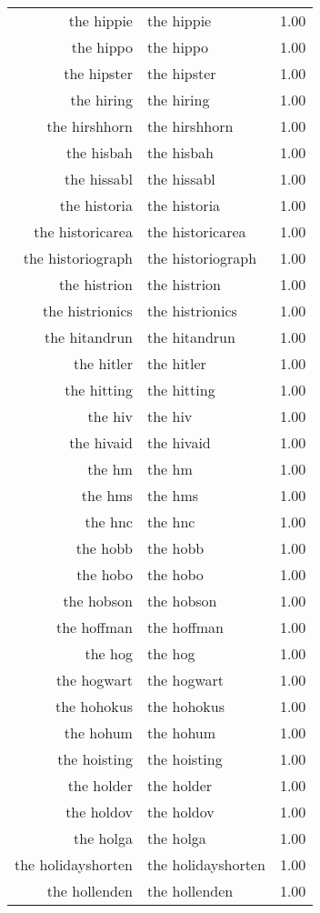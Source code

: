 \begin{table}[ht]
\begin{tabular}{rlr}
  the hippie & the hippie & 1.00 \\ 
  the hippo & the hippo & 1.00 \\ 
  the hipster & the hipster & 1.00 \\ 
  the hiring & the hiring & 1.00 \\ 
  the hirshhorn & the hirshhorn & 1.00 \\ 
  the hisbah & the hisbah & 1.00 \\ 
  the hissabl & the hissabl & 1.00 \\ 
  the historia & the historia & 1.00 \\ 
  the historicarea & the historicarea & 1.00 \\ 
  the historiograph & the historiograph & 1.00 \\ 
  the histrion & the histrion & 1.00 \\ 
  the histrionics & the histrionics & 1.00 \\ 
  the hitandrun & the hitandrun & 1.00 \\ 
  the hitler & the hitler & 1.00 \\ 
  the hitting & the hitting & 1.00 \\ 
  the hiv & the hiv & 1.00 \\ 
  the hivaid & the hivaid & 1.00 \\ 
  the hm & the hm & 1.00 \\ 
  the hms & the hms & 1.00 \\ 
  the hnc & the hnc & 1.00 \\ 
  the hobb & the hobb & 1.00 \\ 
  the hobo & the hobo & 1.00 \\ 
  the hobson & the hobson & 1.00 \\ 
  the hoffman & the hoffman & 1.00 \\ 
  the hog & the hog & 1.00 \\ 
  the hogwart & the hogwart & 1.00 \\ 
  the hohokus & the hohokus & 1.00 \\ 
  the hohum & the hohum & 1.00 \\ 
  the hoisting & the hoisting & 1.00 \\ 
  the holder & the holder & 1.00 \\ 
  the holdov & the holdov & 1.00 \\ 
  the holga & the holga & 1.00 \\ 
  the holidayshorten & the holidayshorten & 1.00 \\ 
  the hollenden & the hollenden & 1.00 \\ 

\end{tabular}
\end{table}

